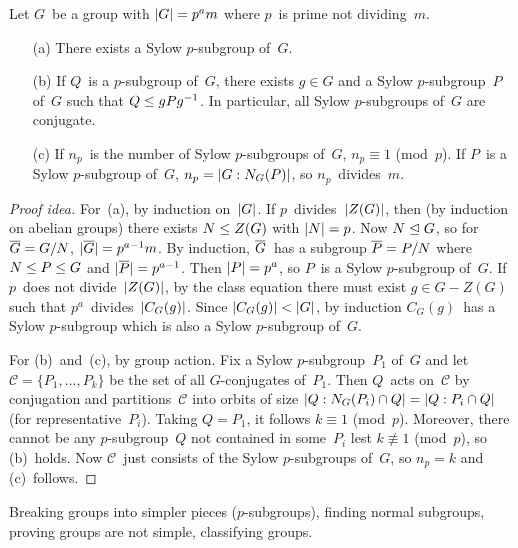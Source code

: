 \begin{thm}[Sylow]
Let \(G\)~be a group with \(\ord{G}=p^a m\) where \(p\)~is prime not dividing~\(m\).
\begin{enumerate}[itemsep=0pt]
\item[(a)] There exists a Sylow \(p\)-subgroup of~\(G\).
\item[(b)] If \(Q\)~is a \(p\)-subgroup of~\(G\), there exists \(g\in G\) and a Sylow \(p\)-subgroup~\(P\) of~\(G\) such that \(Q\subgroupeq gPg^{-1}\). In particular, all Sylow \(p\)-subgroups of~\(G\) are conjugate.
\item[(c)] If \(n_p\)~is the number of Sylow \(p\)-subgroups of~\(G\), \(n_p\equiv 1\) (mod~\(p\)). If \(P\)~is a Sylow \(p\)-subgroup of~\(G\), \(n_p=\idx{N_G(P)}{G}\), so \(n_p\)~divides~\(m\).
\end{enumerate}
\end{thm}
\begin{proof}[Proof idea]
For~(a), by induction on~\(\ord{G}\). If \(p\)~divides~\(\ord{Z(G)}\), then (by induction on abelian groups) there exists \(N\subgroupeq Z(G)\) with \(\ord{N}=p\). Now \(N\normsubgroupeq G\), so for \(\res{G}=G/N\), \(\ord{\res{G}}=p^{a-1}m\). By induction, \(\res{G}\)~has a subgroup \(\res{P}=P/N\) where \(N\subgroupeq P\subgroupeq G\) and \(\ord{\res{P}}=p^{a-1}\). Then \(\ord{P}=p^a\), so \(P\)~is a Sylow \(p\)-subgroup of~\(G\). If \(p\)~does not divide~\(\ord{Z(G)}\), by the class equation there must exist \(g\in G-Z(G)\) such that \(p^a\)~divides~\(\ord{C_G(g)}\). Since \(\ord{C_G(g)}<\ord{G}\), by induction \(C_G(g)\)~has a Sylow \(p\)-subgroup which is also a Sylow \(p\)-subgroup of~\(G\).

For (b)~and~(c), by group action. Fix a Sylow \(p\)-subgroup~\(P_1\) of~\(G\) and let \(\mathcal{C}=\{P_1,\ldots,P_k\}\) be the set of all \(G\)-conjugates of~\(P_1\). Then \(Q\)~acts on~\(\mathcal{C}\) by conjugation and partitions~\(\mathcal{C}\) into orbits of size \(\idx{N_G(P_i)\sect Q}{Q}=\idx{P_i\sect Q}{Q}\) (for representative~\(P_i\)). Taking \(Q=P_1\), it follows \(k\equiv1\) (mod~\(p\)). Moreover, there cannot be any \(p\)-subgroup~\(Q\) not contained in some~\(P_i\) lest \(k\not\equiv1\) (mod~\(p\)), so (b)~holds. Now \(\mathcal{C}\)~just consists of the Sylow \(p\)-subgroups of~\(G\), so \(n_p=k\) and (c)~follows.
\end{proof}
\begin{app}
Breaking groups into simpler pieces (\(p\)-subgroups), finding normal subgroups, proving groups are not simple, classifying groups.
\end{app}


